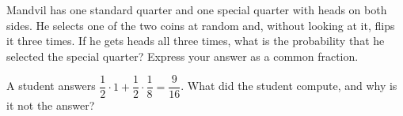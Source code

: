 Mandvil has one standard quarter and one special quarter with heads on both sides. He selects one of the two coins at random and, without looking at it, flips it three times. If he gets heads all three times, what is the probability that he selected the special quarter? Express your answer as a common fraction.

A student answers $\dfrac12\cdot1+\dfrac12\cdot\dfrac18=\dfrac{9}{16}$. What did the student compute, and why is it not the answer?
